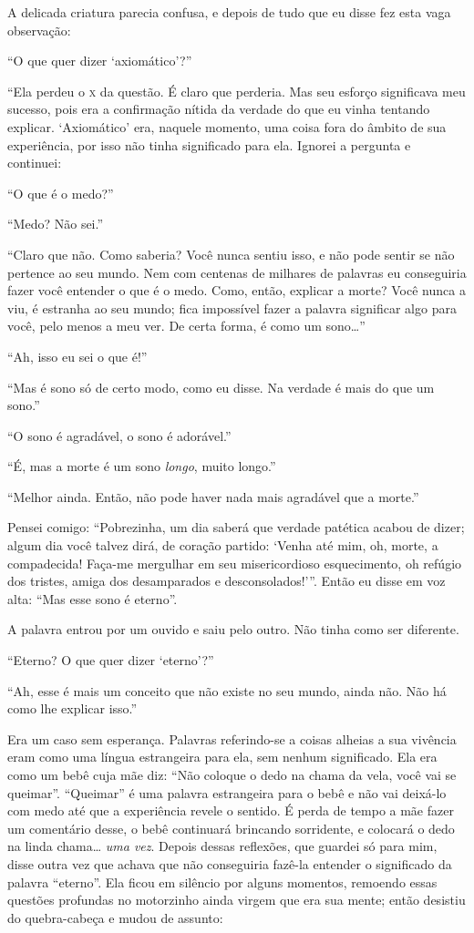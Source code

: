 A delicada criatura parecia confusa, e depois de tudo que eu disse fez esta
vaga observação:

“O que quer dizer ‘axiomático’?”

“Ela perdeu o \textsc{x} da questão. É claro que perderia. Mas seu esforço
significava meu sucesso, pois era a confirmação nítida da verdade do que
eu vinha tentando explicar. ‘Axiomático’ era, naquele momento, uma coisa
fora do âmbito de sua experiência, por isso não tinha significado para ela.
Ignorei a pergunta e continuei:

“O que é o medo?”

“Medo? Não sei.”

``Claro que não. Como saberia? Você nunca
sentiu isso, e não pode sentir se não pertence ao seu mundo. Nem com
centenas de milhares de palavras eu conseguiria fazer você entender o que é o
medo. Como, então, explicar a morte? Você nunca a viu, é
estranha ao seu mundo; fica impossível fazer a palavra significar algo
para você, pelo menos a meu ver. De certa forma, é como um
sono\ldots{}''

``Ah, isso eu sei o que é!''

``Mas é sono só de certo modo, como eu disse. Na verdade é mais
do que um sono.''

``O sono é agradável, o sono é adorável.''

``É, mas a morte é um sono \textit{longo}, muito longo.''

``Melhor ainda. Então, não pode haver nada mais agradável que a morte.''

Pensei comigo: ``Pobrezinha, um dia saberá que
verdade patética acabou de dizer; algum dia você talvez dirá, de coração
partido: `Venha até mim, oh, morte, a
compadecida! Faça-me mergulhar em seu misericordioso
esquecimento, oh refúgio dos tristes, amiga dos desamparados e
desconsolados!'”. Então eu disse em voz alta:
``Mas esse sono é eterno''.

A palavra entrou por um ouvido e saiu pelo outro. Não tinha como ser diferente.

``Eterno? O que quer dizer ‘eterno’?''

``Ah, esse é mais um conceito que não existe no seu mundo,
ainda não. Não há como lhe explicar isso.''

Era um caso sem esperança. Palavras referindo-se a coisas alheias a sua
vivência eram como uma língua estrangeira para ela, sem nenhum significado. 
Ela era como um bebê cuja mãe diz: ``Não coloque o
dedo na chama da vela, você vai se queimar''. “Queimar” é uma
palavra estrangeira para o bebê e não vai deixá-lo com medo até que a
experiência revele o sentido. É perda de tempo a mãe fazer um
comentário desse, o bebê continuará brincando sorridente, e colocará o dedo na
linda chama\ldots{} \textit{uma vez}. Depois dessas
reflexões, que guardei só para mim,  disse outra vez que
achava que não conseguiria fazê-la entender o significado da palavra
“eterno”. Ela ficou em silêncio por alguns momentos, remoendo essas
questões profundas no motorzinho ainda virgem que era sua mente; então desistiu do
quebra-cabeça e mudou de assunto:

